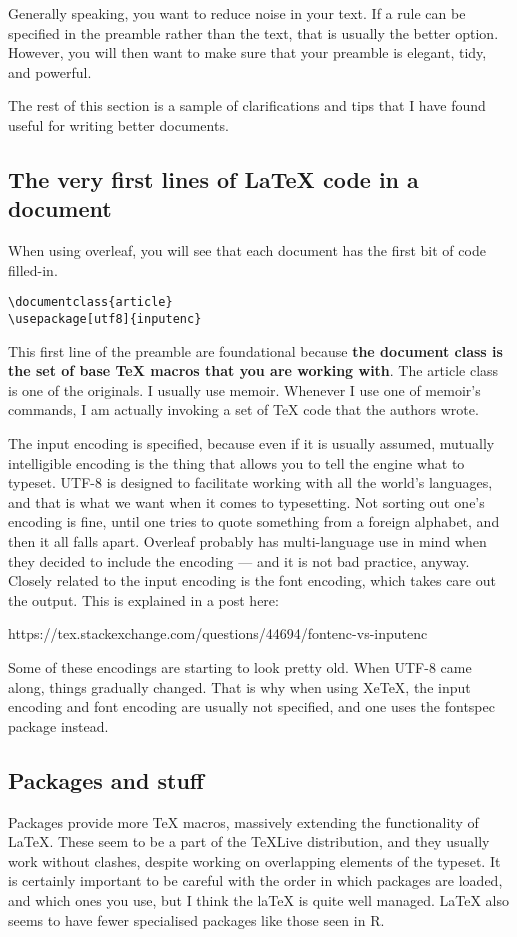 \documentclass[11pt, oneside]{memoir}
\begin{document}
Generally speaking, you want to reduce noise in your text. If a rule can be specified in the preamble rather than the text, that is usually the better option. However, you will then want to make sure that your preamble is elegant, tidy, and powerful.

The rest of this section is a sample of clarifications and tips that I have found useful for writing better documents.

\subsection{The very first lines of LaTeX code in a document}

When using overleaf, you will see that each document has the first bit of code filled-in.

\begin{verbatim}
\documentclass{article}
\usepackage[utf8]{inputenc}
\end{verbatim}

This first line of the preamble are foundational because \textbf{the document class is the set of base TeX macros that you are working with}. The article class is one of the originals. I usually use memoir. Whenever I use one of memoir's commands, I am actually invoking a set of TeX code that the authors wrote.

The input encoding is specified, because even if it is usually assumed, mutually intelligible encoding is the thing that allows you to tell the engine what to typeset. UTF-8 is designed to facilitate working with all the world's languages, and that is what we want when it comes to typesetting. Not sorting out one's encoding is fine, until one tries to quote something from a foreign alphabet, and then it all falls apart. Overleaf probably has multi-language use in mind when they decided to include the encoding — and it is not bad practice, anyway. Closely related to the input encoding is the font encoding, which takes care out the output. This is explained in a post here:

https://tex.stackexchange.com/questions/44694/fontenc-vs-inputenc

Some of these encodings are starting to look pretty old. When UTF-8 came along, things gradually changed. That is why when using XeTeX, the input encoding and font encoding are usually not specified, and one uses the fontspec package instead.

\subsection{Packages and stuff}
Packages provide more TeX macros, massively extending the functionality of LaTeX. These seem to be a part of the TeXLive distribution, and they usually work without clashes, despite  working on overlapping elements of the typeset. It is certainly important to be careful with the order in which packages are loaded, and which ones you use, but I think the laTeX is quite well managed. LaTeX also seems to have fewer specialised packages like those seen in R.
\end{document}

